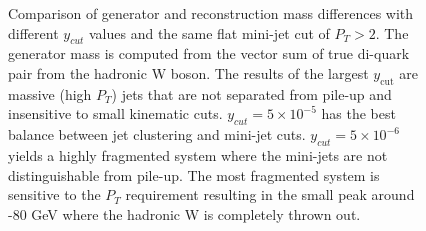 \begin{figure}
    \centering
        \centering
        
        \caption{Comparison of generator and reconstruction mass differences with different $y_{cut}$ values and the same  flat mini-jet cut of $P_T > 2$. The generator mass is computed from the vector sum of true di-quark pair from the hadronic W boson. The results of the largest $y_{\text{cut}}$ are massive (high $P_T$) jets that are not separated from pile-up and insensitive to small kinematic cuts. $y_{cut} = 5\times 10^{-5}$ has the best balance between jet clustering and mini-jet cuts. $y_{cut} = 5\times 10^{-6}$ yields a highly fragmented system where the mini-jets are not distinguishable from pile-up. The most fragmented system is sensitive to the $P_T$ requirement resulting in the small peak around -80 GeV where the hadronic W is completely thrown out.  }
        \label{fig:supdiff}
       \end{figure}
       

